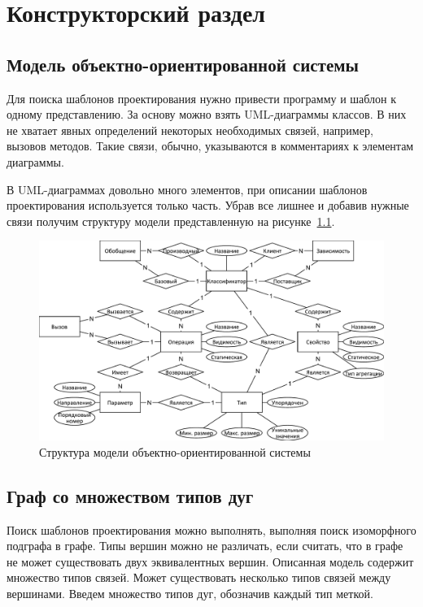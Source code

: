 \chapter{Конструкторский раздел}
\label{cha:design}

\section{Модель объектно-ориентированной системы}

Для поиска шаблонов проектирования нужно привести программу и шаблон к одному представлению.
За основу можно взять UML-диаграммы классов.
В них не хватает явных определений некоторых необходимых связей, например, вызовов методов.
Такие связи, обычно, указываются в комментариях к элементам диаграммы.

В UML-диаграммах довольно много элементов, при описании шаблонов проектирования используется только часть.
Убрав все лишнее и добавив нужные связи получим структуру модели представленную на рисунке~\ref{fig:model}.

\begin{figure}[!ht]
\centering
\includegraphics[width=\textwidth]{inc/model.pdf}
\caption{Структура модели объектно-ориентированной системы}
\label{fig:model}
\end{figure}

\section{Граф со множеством типов дуг}

Поиск шаблонов проектирования можно выполнять, выполняя поиск изоморфного подграфа в графе.
Типы вершин можно не различать, если считать, что в графе не может существовать двух эквивалентных вершин.
Описанная модель содержит множество типов связей.
Может существовать несколько типов связей между вершинами.
Введем множество типов дуг, обозначив каждый тип меткой.

